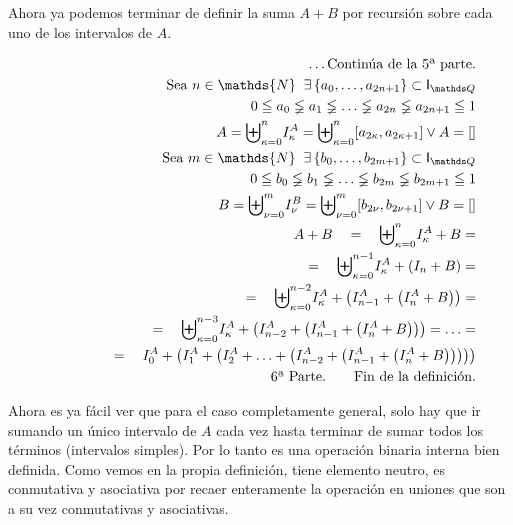 \documentclass[final,12pt,a4paper,twoside,fleqn]{extbook}
\newcommand{\set}[1]{\ensuremath{\left\lbrace{#1}\right\rbrace}}
\newcommand{\setN}{\ensuremath{\mathds{N}}}
\theoremstyle{definition}
\theoremstyle{remark}
\begin{document}
	Ahora ya podemos terminar de definir la suma \( A + B \) por recursión sobre cada uno de los intervalos de \(A\).



\begin{eqnarray}
\nonumber
&&\ldots\text{Continúa de la 5ª parte.}\\ \nonumber
&&\text{Sea  } n \in \setN \;\; \exists \set{a_0,\ldots,a_{2n+1}} \subset \IQ\\
&&\qquad 0 \leqq a_0 \lneqq a_1  \lneqq \ldots \lneqq a_{2n} \lneqq a_{2n+1} \leqq 1\\
&& A = {\biguplus}_{\kappa=0}^{n} I_{\kappa}^A = {\biguplus}_{\kappa=0}^{n} [a_{2\kappa},a_{2\kappa+1}] \vee A = []\\
&&\text{Sea  } m \in \setN \;\; \exists \set{b_0,\ldots,b_{2m+1}} \subset \IQ\\
&&\qquad 0 \leqq b_0 \lneqq b_1 \lneqq \ldots \lneqq b_{2m} \lneqq b_{2m+1} \leqq 1\\
&& B = {\biguplus}_{\nu=0}^{m} I_{\nu}^B = {\biguplus}_{\nu=0}^{m} [b_{2\nu},b_{2\nu+1}] \vee B = []\\
&&A + B \quad=\quad {\biguplus}_{\kappa=0}^{n} I_{\kappa}^A + B =\\
&& \qquad\qquad =\quad {\biguplus}_{\kappa=0}^{n-1} I_{\kappa}^A + \left( I_{n} + B \right) =\\
&&\qquad\qquad=\quad {\biguplus}_{\kappa=0}^{n-2} I_{\kappa}^A + \left( I_{n-1}^A + \left( I_{n}^A + B \right) \right) =\\
&&\qquad\qquad=\quad {\biguplus}_{\kappa=0}^{n-3} I_{\kappa}^A + \left( I_{n-2}^A + \left( I_{n-1}^A + \left( I_{n}^A + B \right) \right) \right) = \ldots =\\
&&\qquad\qquad=\quad I_{0}^A + \left( I_{1}^A + \left( I_{2}^A +  \ldots + \left( I_{n-2}^A + \left( I_{n-1}^A + \left( I_{n}^A + B \right) \right) \right) \right) \right)\\ \nonumber
&&\text{6ª Parte.}\qquad\text{Fin de la definición.}
\end{eqnarray}



	Ahora es ya fácil ver que para el caso completamente general, solo hay
que ir sumando un único intervalo de \(A\) cada vez hasta terminar de sumar
todos los términos (intervalos simples). Por lo tanto es una operación
binaria interna bien definida. Como vemos en la propia definición, tiene
elemento neutro, es conmutativa y asociativa por recaer enteramente la
operación en uniones que son a su vez conmutativas y asociativas.
\end{document}
